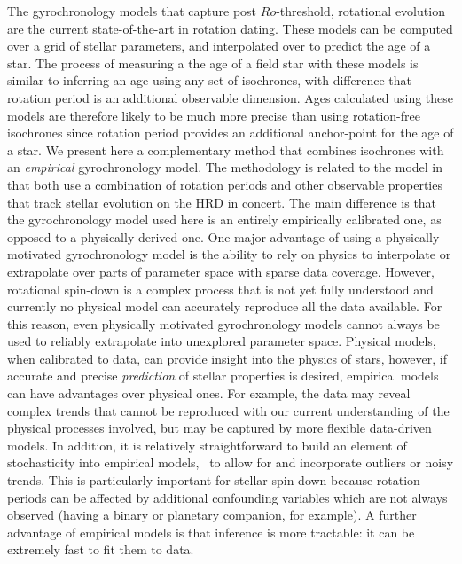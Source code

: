 The gyrochronology models that capture post $Ro$-threshold, rotational
evolution \citep{vansaders2016} are the current state-of-the-art in rotation
dating.
These models can be computed over a grid of stellar parameters, and
interpolated over to predict the age of a star.
The process of measuring a the age of a field star with these models is
similar to inferring an age using any set of isochrones, with difference that
rotation period is an additional observable dimension.
Ages calculated using these models are therefore likely to be much more
precise than using rotation-free isochrones since rotation period provides an
additional anchor-point for the age of a star.
We present here a complementary method that combines isochrones with an {\it
empirical} gyrochronology model.
The methodology is related to the \citet{vansaders2016} model in that both use
a combination of rotation periods and other observable properties that track
stellar evolution on the HRD in concert.
The main difference is that the gyrochronology model used here is an entirely
empirically calibrated one, as opposed to a physically derived one.
One major advantage of using a physically motivated gyrochronology model is
the ability to rely on physics to interpolate or extrapolate over parts of
parameter space with sparse data coverage.
However, rotational spin-down is a complex process that is not yet fully
understood and currently no physical model can accurately reproduce all the
data available.
For this reason, even physically motivated gyrochronology models cannot always
be used to reliably extrapolate into unexplored parameter space.
Physical models, when calibrated to data, can provide insight into the physics
of stars, however, if accurate and precise {\it prediction} of stellar
properties is desired, empirical models can have advantages over physical
ones.
For example, the data may reveal complex trends that cannot be reproduced with
our current understanding of the physical processes involved, but may be
captured by more flexible data-driven models.
In addition, it is relatively straightforward to build an element of
stochasticity into empirical models, \ie\ to allow for and incorporate
outliers or noisy trends.
This is particularly important for stellar spin down because rotation periods
can be affected by additional confounding variables which are not always
observed (having a binary or planetary companion, for example).
A further advantage of empirical models is that inference is more tractable:
it can be extremely fast to fit them to data.
